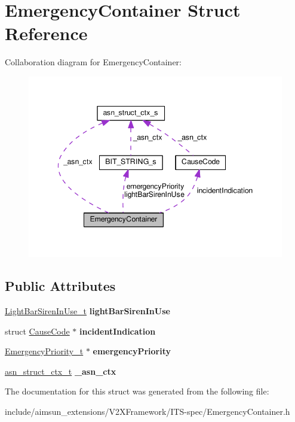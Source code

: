 \hypertarget{structEmergencyContainer}{}\section{Emergency\+Container Struct Reference}
\label{structEmergencyContainer}


Collaboration diagram for Emergency\+Container\+:\nopagebreak
\begin{figure}[H]
\begin{center}
\leavevmode
\includegraphics[width=345pt]{structEmergencyContainer__coll__graph}
\end{center}
\end{figure}
\subsection*{Public Attributes}
\begin{DoxyCompactItemize}
\item 
\hyperlink{structBIT__STRING__s}{Light\+Bar\+Siren\+In\+Use\+\_\+t} {\bfseries light\+Bar\+Siren\+In\+Use}\hypertarget{structEmergencyContainer_a01e25ac5141f3039b4f102c9927a8e27}{}\label{structEmergencyContainer_a01e25ac5141f3039b4f102c9927a8e27}

\item 
struct \hyperlink{structCauseCode}{Cause\+Code} $\ast$ {\bfseries incident\+Indication}\hypertarget{structEmergencyContainer_a8284bec548ab8d38374162b2cbc8c8a6}{}\label{structEmergencyContainer_a8284bec548ab8d38374162b2cbc8c8a6}

\item 
\hyperlink{structBIT__STRING__s}{Emergency\+Priority\+\_\+t} $\ast$ {\bfseries emergency\+Priority}\hypertarget{structEmergencyContainer_aec78c80308824d3d10c5f7a1bbd25da2}{}\label{structEmergencyContainer_aec78c80308824d3d10c5f7a1bbd25da2}

\item 
\hyperlink{structasn__struct__ctx__s}{asn\+\_\+struct\+\_\+ctx\+\_\+t} {\bfseries \+\_\+asn\+\_\+ctx}\hypertarget{structEmergencyContainer_a7766c0f87cbbe9ce3756519f3153e43e}{}\label{structEmergencyContainer_a7766c0f87cbbe9ce3756519f3153e43e}

\end{DoxyCompactItemize}


The documentation for this struct was generated from the following file\+:\begin{DoxyCompactItemize}
\item 
include/aimsun\+\_\+extensions/\+V2\+X\+Framework/\+I\+T\+S-\/spec/Emergency\+Container.\+h\end{DoxyCompactItemize}
